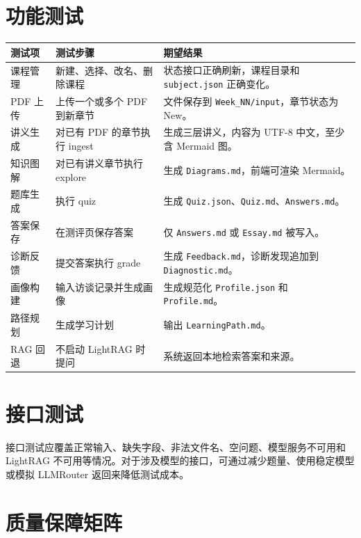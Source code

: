 \documentclass[UTF8,fontset=windows,zihao=-4,openany]{ctexrep}
\begin{document}
\section{功能测试}

\begin{longtable}{p{}p{}p{}}
\toprule
测试项 & 测试步骤 & 期望结果\\
\midrule
课程管理 & 新建、选择、改名、删除课程 & 状态接口正确刷新，课程目录和 \texttt{subject.json} 正确变化。\\
PDF 上传 & 上传一个或多个 PDF 到新章节 & 文件保存到 \texttt{Week\_NN/input}，章节状态为 New。\\
讲义生成 & 对已有 PDF 的章节执行 ingest & 生成三层讲义，内容为 UTF-8 中文，至少含 Mermaid 图。\\
知识图解 & 对已有讲义章节执行 explore & 生成 \texttt{Diagrams.md}，前端可渲染 Mermaid。\\
题库生成 & 执行 quiz & 生成 \texttt{Quiz.json}、\texttt{Quiz.md}、\texttt{Answers.md}。\\
答案保存 & 在测评页保存答案 & 仅 \texttt{Answers.md} 或 \texttt{Essay.md} 被写入。\\
诊断反馈 & 提交答案执行 grade & 生成 \texttt{Feedback.md}，诊断发现追加到 \texttt{Diagnostic.md}。\\
画像构建 & 输入访谈记录并生成画像 & 生成规范化 \texttt{Profile.json} 和 \texttt{Profile.md}。\\
路径规划 & 生成学习计划 & 输出 \texttt{LearningPath.md}。\\
RAG 回退 & 不启动 LightRAG 时提问 & 系统返回本地检索答案和来源。\\
\bottomrule
\end{longtable}

\section{接口测试}

接口测试应覆盖正常输入、缺失字段、非法文件名、空问题、模型服务不可用和 LightRAG 不可用等情况。对于涉及模型的接口，可通过减少题量、使用稳定模型或模拟 LLMRouter 返回来降低测试成本。

\section{质量保障矩阵}
\end{document}
